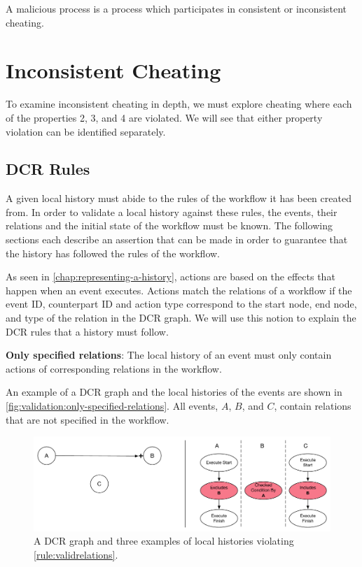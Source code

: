 	\newpar A malicious process is a process which participates in consistent or inconsistent cheating.
	
	\section{Inconsistent Cheating}
	To examine inconsistent cheating in depth, we must explore cheating where each of the properties 2, 3, and 4 are violated. We will see that either property violation can be identified separately.
		
	\subsection{DCR Rules}
	A given local history must abide to the rules of the workflow it has been created from. 
	In order to validate a local history against these rules, the events, their relations and the initial state of the workflow must be known. The following sections each describe an assertion that can be made in order to guarantee that the history has followed the rules of the workflow.
	
	\newpar As seen in \autoref{chap:representing-a-history}, actions are based on the effects that happen when an event executes. Actions match the relations of a workflow if the event ID, counterpart ID and action type correspond to the start node, end node, and type of the relation in the DCR graph. We will use this notion to explain the DCR rules that a history must follow.
	
	\begin{ruledef}
		\textbf{Only specified relations}: The local history of an event must only contain actions of corresponding relations in the workflow.
		\label{rule:validrelations}
	\end{ruledef}
	
	\noindent An example of a DCR graph and the local histories of the events are shown in \autoref{fig:validation:only-specified-relations}. All events, $A$, $B$, and $C$, contain relations that are not specified in the workflow.
	
	\begin{figure}[H]
		\centering
		\includegraphics[width=\textwidth]{6validation/images/only-specified-relations.pdf}
		\caption{A DCR graph and three examples of local histories violating \autoref{rule:validrelations}.}
		\label{fig:validation:only-specified-relations}
	\end{figure}
	

